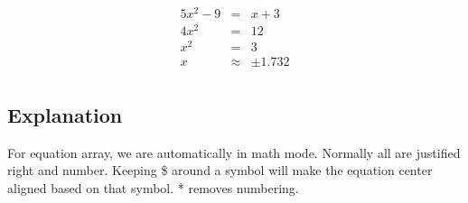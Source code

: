\documentclass[11pt]{article}
\begin{document}
\begin{eqnarray*}
5x^2 - 9 &=& x +3 \\
4x^2 &=& 12 \\
x^2 &=& 3 \\
x &\approx&\pm 1.732 \\
\end{eqnarray*}

\subsection*{Explanation}
For equation array, we are automatically in math mode.
Normally all are justified right and number. Keeping \$ around a symbol will make the equation center aligned based on that symbol. * removes numbering.
\end{document}
